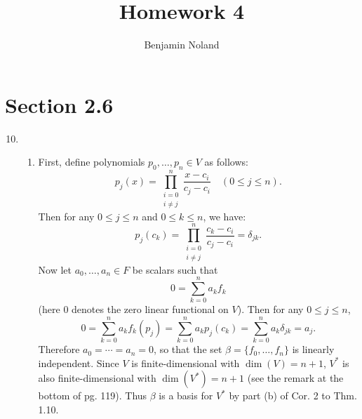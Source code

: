 \documentclass[12pt]{article}
\title{Homework 4}
\author{Benjamin Noland}
\date{}
\begin{document}
\maketitle

\section*{Section 2.6}

\begin{enumerate}
\setcounter{enumi}{9}
\item
\begin{enumerate}
\item
First, define polynomials $p_0, \dots, p_n \in V$ as follows:
\begin{equation*}
p_j(x) = \prod_{\substack{i = 0 \\ i \neq j}}^n \frac{x - c_i}{c_j - c_i} \quad (0 \leq j \leq n).
\end{equation*}
Then for any $0 \leq j \leq n$ and $0 \leq k \leq n$, we have:
\begin{equation*}
p_j(c_k) = \prod_{\substack{i = 0 \\ i \neq j}}^n \frac{c_k - c_i}{c_j - c_i} = \delta_{jk}.
\end{equation*}
Now let $a_0, \dots, a_n \in F$ be scalars such that
\begin{equation*}
0 = \sum_{k=0}^n a_k f_k
\end{equation*}
(here $0$ denotes the zero linear functional on $V$). Then for any $0 \leq j \leq n$,
\begin{equation*}
0 = \sum_{k=0}^n a_k f_k(p_j) = \sum_{k=0}^n a_k p_j(c_k) = \sum_{k=0}^n a_k \delta_{jk} = a_j.
\end{equation*}
Therefore $a_0 = \cdots = a_n = 0$, so that the set $\beta = \{f_0, \dots, f_n\}$ is linearly independent. Since $V$ is finite-dimensional with $\dim(V) = n+1$, $V^\ast$ is also finite-dimensional with $\dim(V^\ast) = n+1$ (see the remark at the bottom of pg. 119). Thus $\beta$ is a basis for $V^\ast$ by part (b) of Cor. 2 to Thm. 1.10.


\end{enumerate}
\end{enumerate}
\end{document}
